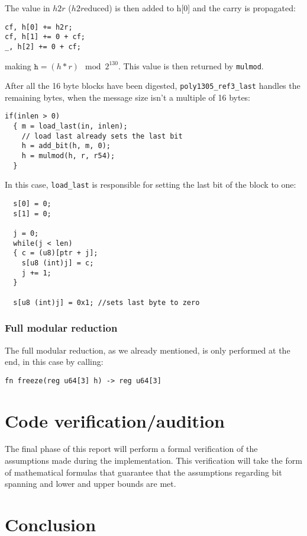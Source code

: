 \documentclass[twocolumn]{article}
\begin{document}
The value in $h2r$ ($h2r$educed) is then added to h[0] and the carry is propagated:

\begin{verbatim}
cf, h[0] += h2r;
cf, h[1] += 0 + cf;
_, h[2] += 0 + cf;
\end{verbatim}

making $\texttt{h} = (h*r)\mod{2^{130}}$. This value is then returned by \texttt{mulmod}.

After all the 16 byte blocks have been digested, \texttt{poly1305\_ref3\_last} handles the remaining bytes, when the message size isn't a multiple of 16 bytes:
\begin{verbatim}
if(inlen > 0)
  { m = load_last(in, inlen);
    // load last already sets the last bit
    h = add_bit(h, m, 0);
    h = mulmod(h, r, r54);
  }
\end{verbatim}
In this case, \texttt{load\_last} is responsible for setting the last bit of the block to one:
\begin{verbatim}
  s[0] = 0;
  s[1] = 0;

  j = 0;
  while(j < len)
  { c = (u8)[ptr + j];
    s[u8 (int)j] = c;
    j += 1;
  }

  s[u8 (int)j] = 0x1; //sets last byte to zero
\end{verbatim}

\subsubsection{Full modular reduction}
The full modular reduction, as we already mentioned, is only performed at the end, in this case by calling:
\begin{verbatim}
fn freeze(reg u64[3] h) -> reg u64[3]
\end{verbatim}


\section{Code verification/audition}
The final phase of this report will perform a formal verification of the assumptions made during the implementation. This verification will take the form of
mathematical formulas that guarantee that the assumptions regarding bit spanning and lower and upper bounds are met.

\section{Conclusion}

\printbibliography

\onecolumn
\begin{appendices}
\end{appendices}
\end{document}
